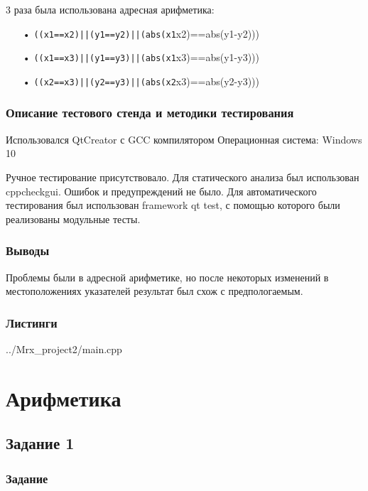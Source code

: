 \documentclass[12pt,a4paper]{report}
\begin{document}
3 раза была использована адресная арифметика:
\begin{enumerate}
\item[•] \verb-((x1==x2)||(y1==y2)||(abs(x1-x2)==abs(y1-y2)))
\item[•] \verb-((x1==x3)||(y1==y3)||(abs(x1-x3)==abs(y1-y3)))
\item[•] \verb-((x2==x3)||(y2==y3)||(abs(x2-x3)==abs(y2-y3)))
\end{enumerate}

\subsection{Описание тестового стенда и методики тестирования}
Использовался QtCreator с GCC компилятором
Операционная система: Windows 10


Ручное тестирование присутствовало.
Для статического анализа был использован cppcheckgui. Ошибок и предупреждений не было.
Для автоматического тестирования был использован framework qt test, с помощью которого были реализованы модульные тесты.


\subsection{Выводы}

Проблемы были в адресной арифметике, но после некоторых изменений в местоположениях указателей результат был схож с предпологаемым.

\subsection*{Листинги}


{../Mrx_project2/main.cpp}

\chapter{Арифметика}

\section{Задание 1}

\subsection{Задание}
\end{document}
